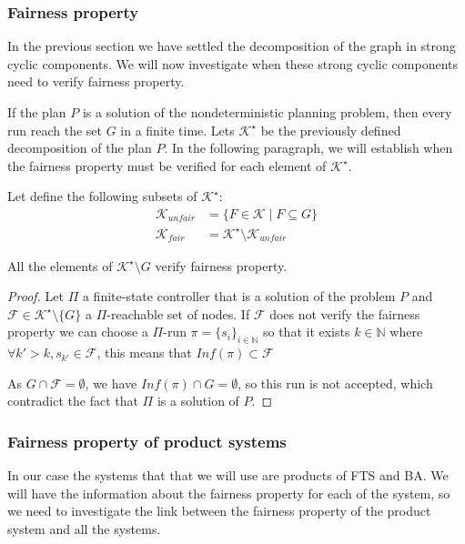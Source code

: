 \subsubsection{Fairness property}
In the previous section we have settled the decomposition of the graph in strong cyclic components.
We will now investigate when these strong cyclic components need to verify fairness property.

If the plan $P$ is a solution of the nondeterministic planning problem, then every run reach the set $G$ in a finite time.
Lets $\mathcal{K}^\star$ be the previously defined decomposition of the plan $P$.
In the following paragraph, we will establish when the fairness property must be verified for each element of $\mathcal{K}^\star$.

Let define the following subsets of $\mathcal{K}^\star$:
\begin{align}
\mathcal{K}_{unfair} &= \{ F \in \mathcal{K} \mid F \subseteq G \}\\
\mathcal{K}_{fair} &= \mathcal{K}^\star \setminus \mathcal{K}_{unfair}
\end{align}

\begin{prop}
All the elements of $\mathcal{K}^\star \setminus {G}$ verify fairness property.
\end{prop}

\begin{proof}
Let $\Pi$ a finite-state controller that is a solution of the problem $P$ and $\mathcal{F} \in \mathcal{K}^\star \setminus \{G\}$ a $\Pi$-reachable set of nodes.
If $\mathcal{F}$ does not verify the fairness property we can choose a $\Pi$-run $\pi = \{s_i\}_{i\in\mathbb{N}}$ so that it exists $k\in\mathbb{N}$ where $\forall k'>k, s_{k'} \in \mathcal{F}$, this means that $Inf(\pi) \subset \mathcal{F}$

As $G \cap \mathcal{F} = \emptyset$, we have $Inf(\pi) \cap G =\emptyset$, so this run is not accepted, which contradict the fact that $\Pi$ is a solution of $P$.
\end{proof}


\subsubsection{Fairness property of product systems}
In our case the systems that that we will use are products of FTS and BA. We will have the information about the fairness property for each of the system, so we need to investigate the link between the fairness property of the product system and all the systems.

